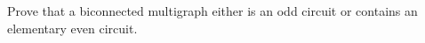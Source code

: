 Prove that a biconnected multigraph either is an odd circuit or contains an elementary even circuit.